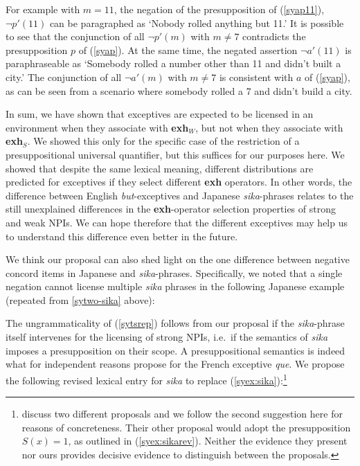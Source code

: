 \documentclass[output=paper]{langscibook}
\begin{document}
For example with $m = 11$, the negation of the presupposition of (\ref{syap11}), $\neg p'(11)$ can be paragraphed as `Nobody rolled anything but 11.'  It is possible to see that the conjunction of all $\neg p'(m)$ with $m \neq 7$ contradicts the presupposition $p$ of (\ref{syap}).   At the same time, the negated assertion $\neg a'(11)$ is paraphraseable as `Somebody rolled a number other than 11 and didn't built a city.' The conjunction of all $\neg a'(m)$ with $m \neq 7$ is consistent with $a$ of (\ref{syap}), as can be seen from a scenario where somebody rolled a 7 and didn't build a city.

In sum, we have shown that exceptives are expected to be licensed in an environment when they associate with \textbf{exh}$_W$, but not when they associate with \textbf{exh}$_S$.  We showed this only for the specific case of the restriction of a presuppositional universal quantifier, but this suffices for our purposes here.  We showed that despite the same lexical meaning, different distributions are predicted for exceptives if they select different \textbf{exh} operators. 
In other words, the difference between English \emph{but}-exceptives and Japanese \emph{sika}-phrases relates to the still unexplained differences in the \textbf{exh}-operator selection properties of strong and weak NPIs. We can hope therefore that the different exceptives may help us to understand this difference even better in the future.

We think our proposal can also shed light on the one difference between negative concord items in Japanese and \emph{sika}-phrases.  Specifically, we noted that a single negation cannot license multiple \emph{sika} phrases in the following Japanese example (repeated from \ref{sytwo-sika} above): 

\z

The ungrammaticality of (\ref{sytsrep}) follows from our proposal if the \emph{sika}-phrase itself intervenes for the licensing of strong NPIs, i.e.\ if the semantics of \emph{sika} imposes a presupposition on their scope. A presuppositional semantics is indeed what \citet[461--462]{fintel07a} for independent reasons propose for the French exceptive \emph{que}. We propose the following revised lexical entry for \emph{sika} to replace  (\ref{syex:sika}):\footnote{\citet{fintel07a} discuss two different proposals and we follow the second suggestion here for reasons of concreteness. Their other proposal would adopt the presupposition $S(x)=1$, as outlined in (\ref{syex:sikarev}). Neither the evidence they present nor ours provides decisive evidence to distinguish between the proposals.}
\end{document}
